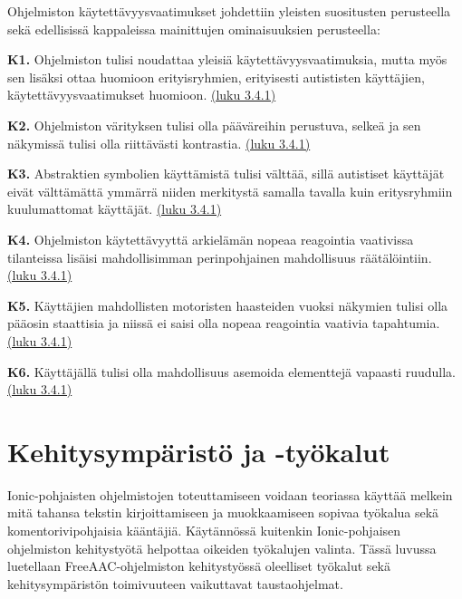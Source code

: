 \documentclass[utf8]{gradu3}
\begin{document}
Ohjelmiston käytettävyysvaatimukset johdettiin yleisten suositusten perusteella sekä edellisissä kappaleissa mainittujen ominaisuuksien perusteella:

\begin{description}
\item \textbf{K1.} Ohjelmiston tulisi noudattaa yleisiä käytettävyysvaatimuksia, mutta myös sen lisäksi ottaa huomioon erityisryhmien, erityisesti autististen käyttäjien, käytettävyysvaatimukset huomioon. \hyperref[general-usability-requirements]{(luku 3.4.1)}

\item \textbf{K2.} Ohjelmiston värityksen tulisi olla pääväreihin perustuva, selkeä ja sen näkymissä tulisi olla riittävästi kontrastia. \hyperref[AAC-colors]{(luku 3.4.1)}

\item \textbf{K3.} Abstraktien symbolien käyttämistä tulisi välttää, sillä autistiset käyttäjät eivät välttämättä ymmärrä niiden merkitystä samalla tavalla kuin eritysryhmiin kuulumattomat käyttäjät. \hyperref[AAC-abstract-symbols]{(luku 3.4.1)}

\item \textbf{K4.} Ohjelmiston käytettävyyttä arkielämän nopeaa reagointia vaativissa tilanteissa lisäisi mahdollisimman perinpohjainen mahdollisuus räätälöintiin. \hyperref[AAC-context-settings]{(luku 3.4.1)}

\item \textbf{K5.} Käyttäjien mahdollisten motoristen haasteiden vuoksi näkymien tulisi olla pääosin staattisia ja niissä ei saisi olla nopeaa reagointia vaativia tapahtumia. \hyperref[AAC-staticity]{(luku 3.4.1)}

\item \textbf{K6.} Käyttäjällä tulisi olla mahdollisuus asemoida elementtejä vapaasti ruudulla. \hyperref[AAC-staticity]{(luku 3.4.1)}
\end{description}

\section{Kehitysympäristö ja -työkalut}

Ionic-pohjaisten ohjelmistojen toteuttamiseen voidaan teoriassa käyttää melkein mitä tahansa tekstin kirjoittamiseen ja muokkaamiseen sopivaa työkalua sekä komentorivipohjaisia kääntäjiä. Käytännössä kuitenkin Ionic-pohjaisen ohjelmiston kehitystyötä helpottaa oikeiden työkalujen valinta. Tässä luvussa luetellaan FreeAAC-ohjelmiston kehitystyössä oleelliset työkalut sekä kehitysympäristön toimivuuteen vaikuttavat taustaohjelmat.
\end{document}
